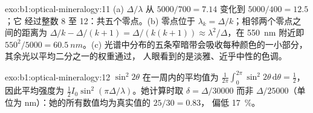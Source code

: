 \begin{solution}{exo:b1:optical-mineralogy:11}
(a) $\Delta/\lambda$ 从 $5000/700 = 7.14$ 变化到 $5000/400 = 12.5$；它
经过整数 8 至 12：共五个零点。(b) 零点位于
$\lambda_k = \Delta/k$；相邻两个零点之间的距离为 $\Delta/k - \Delta/(k + 1) =
\Delta/(k(k + 1)) \approx \lambda^2/\Delta$，在 \qty{550}{nm} 附近即 $550^2/5000 =
\qty{60.5}{nm}$。(c) 光谱中分布的五条窄暗带会吸收每种颜色的一小部分，
其余光以平均二分之一的权重通过，
人眼看到的是淡雅、近乎中性的色调。
\end{solution}

\begin{solution}{exo:b1:optical-mineralogy:12}
$\sin^2 2\theta$ 在一周内的平均值为 $\frac1{2\pi}\int_0^{2\pi}\sin^2 2\theta\,
\mathrm d\theta = \frac12$，因此平均强度为
$\frac12 I_0\sin^2(\pi\Delta/\lambda)$。她计算时取 $\delta = \Delta/30000$
而非 $\Delta/25000$（单位为 nm）：她的所有数值均为真实值的 $25/30 = 0.83$，
偏低 \qty{17}{\percent}。
\end{solution}

